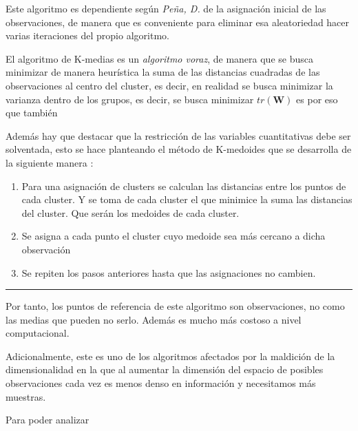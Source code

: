 \noindent Este algoritmo es dependiente según \emph{Peña, D.}\cite{Peña 2002} de la asignación inicial de las observaciones, de manera que es conveniente para eliminar esa aleatoriedad hacer varias iteraciones del propio algoritmo. 

\noindent El algoritmo de K-medias es un \emph{algoritmo voraz}, de manera que se busca minimizar de manera heurística la suma de las distancias cuadradas de las observaciones al centro del cluster, es decir, en realidad se busca minimizar la varianza dentro de los grupos, es decir, se busca minimizar $tr(\mathbf{W})$ es por eso que también 


\noindent Además hay que destacar que la restricción de las variables cuantitativas debe ser solventada, esto se hace planteando el método de K-medoides que se desarrolla de la siguiente manera :

\begin{enumerate}
\hrule

\item Para una asignación de clusters se calculan las distancias entre los puntos de cada cluster. Y se toma de cada cluster el que minimice la suma las distancias del cluster. Que serán los medoides de cada cluster. 
\item Se asigna a cada punto el cluster cuyo medoide sea más cercano a dicha observación 
\item Se repiten los pasos anteriores hasta que las asignaciones no cambien. 

\end{enumerate}
\hrule
 
\noindent Por tanto, los puntos de referencia de este algoritmo son observaciones, no como las medias que pueden no serlo. Además es mucho más costoso a nivel computacional. 

\noindent Adicionalmente, este es uno de los algoritmos afectados por la maldición de la dimensionalidad en la que al aumentar la dimensión del espacio de posibles observaciones cada vez es menos denso en información y necesitamos más muestras. 

\noindent Para poder analizar 